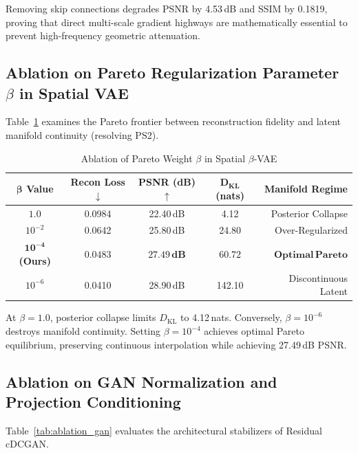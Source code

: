 \documentclass[journal]{IEEEtran}
\begin{document}
Removing skip connections degrades PSNR by 4.53\,dB and SSIM by 0.1819, proving that direct multi-scale gradient highways are mathematically essential to prevent high-frequency geometric attenuation.

\subsection{Ablation on Pareto Regularization Parameter $\beta$ in Spatial VAE}
Table~\ref{tab:ablation_beta} examines the Pareto frontier between reconstruction fidelity and latent manifold continuity (resolving PS2).

\begin{table}[htbp]
\caption{Ablation of Pareto Weight $\beta$ in Spatial $\beta$-VAE}
\label{tab:ablation_beta}
\centering
\scriptsize
\renewcommand{\arraystretch}{1.12}
\setlength{\tabcolsep}{4pt}
\begin{tabularx}{\columnwidth}{@{}c c c c r@{}}
\toprule
$\bm{\beta}$ \textbf{Value} & \textbf{Recon Loss} $\downarrow$ & \textbf{PSNR (dB)} $\uparrow$ & $\bm{D_{\text{KL}}}$ \textbf{(nats)} & \textbf{Manifold Regime} \\
\midrule
$1.0$ & 0.0984 & 22.40\,dB & 4.12 & Posterior Collapse \\
$10^{-2}$ & 0.0642 & 25.80\,dB & 24.80 & Over-Regularized \\
$\mathbf{10^{-4}}$ \textbf{(Ours)} & $\mathbf{0.0483}$ & $\mathbf{27.49\,dB}$ & $\mathbf{60.72}$ & $\mathbf{Optimal\,Pareto}$ \\
$10^{-6}$ & 0.0410 & 28.90\,dB & 142.10 & Discontinuous Latent \\
\bottomrule
\end{tabularx}
\end{table}

At $\beta=1.0$, posterior collapse limits $D_{\text{KL}}$ to 4.12\,nats. Conversely, $\beta=10^{-6}$ destroys manifold continuity. Setting $\beta=10^{-4}$ achieves optimal Pareto equilibrium, preserving continuous interpolation while achieving 27.49\,dB PSNR.

\subsection{Ablation on GAN Normalization and Projection Conditioning}
Table~\ref{tab:ablation_gan} evaluates the architectural stabilizers of Residual cDCGAN.
\end{document}
